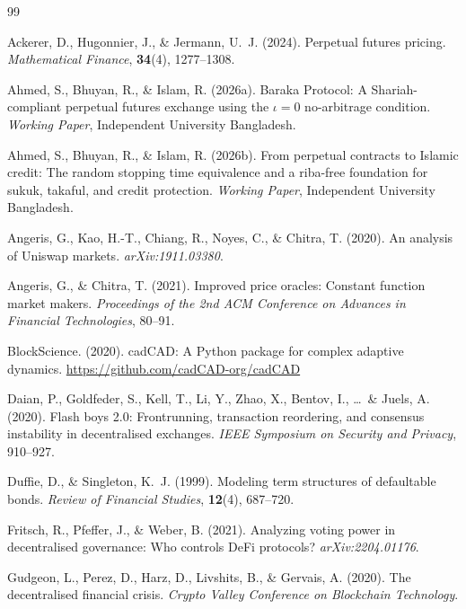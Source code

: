 \documentclass[10pt,twocolumn]{article}
\theoremstyle{plain}
\theoremstyle{definition}
\begin{document}

\begin{thebibliography}{99}

Ackerer, D., Hugonnier, J., \& Jermann, U.~J. (2024).
Perpetual futures pricing.
\textit{Mathematical Finance}, \textbf{34}(4), 1277--1308.

Ahmed, S., Bhuyan, R., \& Islam, R. (2026a).
Baraka Protocol: A Shariah-compliant perpetual futures
exchange using the $\iota=0$ no-arbitrage condition.
\textit{Working Paper}, Independent University Bangladesh.

Ahmed, S., Bhuyan, R., \& Islam, R. (2026b).
From perpetual contracts to Islamic credit: The random
stopping time equivalence and a riba-free foundation for
sukuk, takaful, and credit protection.
\textit{Working Paper}, Independent University Bangladesh.

Angeris, G., Kao, H.-T., Chiang, R., Noyes, C., \&
Chitra, T. (2020).
An analysis of Uniswap markets.
\textit{arXiv:1911.03380}.

Angeris, G., \& Chitra, T. (2021).
Improved price oracles: Constant function market makers.
\textit{Proceedings of the 2nd ACM Conference on
Advances in Financial Technologies}, 80--91.

BlockScience. (2020).
cadCAD: A Python package for complex adaptive dynamics.
\url{https://github.com/cadCAD-org/cadCAD}

Daian, P., Goldfeder, S., Kell, T., Li, Y., Zhao, X.,
Bentov, I., \ldots\ \& Juels, A. (2020).
Flash boys 2.0: Frontrunning, transaction reordering,
and consensus instability in decentralised exchanges.
\textit{IEEE Symposium on Security and Privacy}, 910--927.

Duffie, D., \& Singleton, K.~J. (1999).
Modeling term structures of defaultable bonds.
\textit{Review of Financial Studies}, \textbf{12}(4), 687--720.

Fritsch, R., Pfeffer, J., \& Weber, B. (2021).
Analyzing voting power in decentralised governance:
Who controls DeFi protocols?
\textit{arXiv:2204.01176}.

Gudgeon, L., Perez, D., Harz, D., Livshits, B., \&
Gervais, A. (2020).
The decentralised financial crisis.
\textit{Crypto Valley Conference on Blockchain Technology}.


\end{thebibliography}
\end{document}
